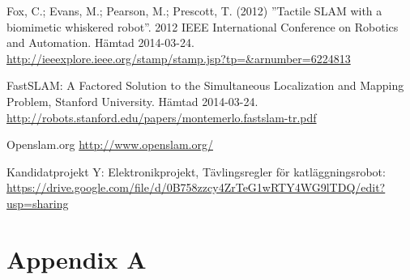\documentclass[a4paper,12pt,fleqn]{article}
\begin{document}
Fox, C.; Evans, M.; Pearson, M.; Prescott, T. (2012)
''Tactile SLAM with a biomimetic whiskered robot''. 2012 IEEE International Conference on Robotics and Automation. Hämtad 2014-03-24.
\url{http://ieeexplore.ieee.org/stamp/stamp.jsp?tp=&arnumber=6224813}

FastSLAM: A Factored Solution to the Simultaneous
Localization and Mapping Problem, Stanford University. Hämtad 2014-03-24.
\url{http://robots.stanford.edu/papers/montemerlo.fastslam-tr.pdf}

Openslam.org
\url{http://www.openslam.org/}

Kandidatprojekt Y: Elektronikprojekt, Tävlingsregler för katläggningsrobot: \url{https://drive.google.com/file/d/0B758zzcy4ZrTeG1wRTY4WG9lTDQ/edit?usp=sharing}

% 
\newpage \appendix \pagestyle{empty}
 \section{Appendix A}
\end{document}
